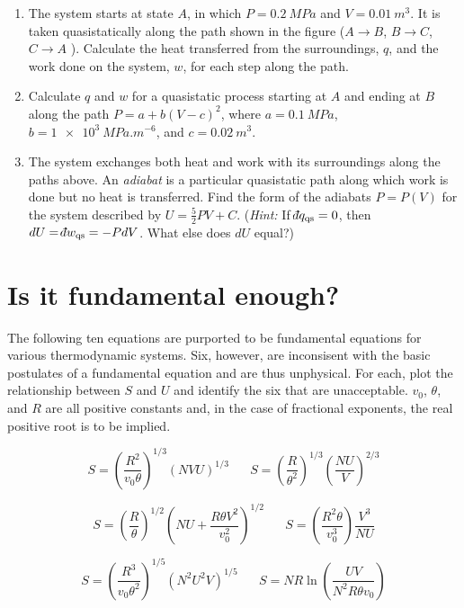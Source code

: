 \documentclass[11pt]{article}
\def\dbar{{\mathchar'26\mkern-12mu d}}
\begin{document}
\begin{enumerate}
\item The system starts at state \(A\), in which \(P= \SI{0.2}{MPa}\) and \(V = \SI{0.01}{m^{3}}\). It is taken quasistatically along the path shown in the figure (\(A \rightarrow B\), \(B \rightarrow C\), \(C \rightarrow A\) ).  Calculate the heat transferred from the surroundings, \(q\), and the work done on the system, \(w\), for each step along the path.

\item Calculate \(q\) and \(w\) for a quasistatic process starting at \(A\) and ending at \(B\) along the path \(P=a + b(V-c)^{2}\), where \(a = \SI{0.1}{MPa}\), \(b= \SI{1e3}{MPa. m^{-6}}\), and \(c = \SI{0.02}{m^{3}}\).

\item The system exchanges both heat and work with its surroundings along the paths above. An \emph{adiabat} is a particular quasistatic path along which work is done but no heat is transferred.  Find the form of the adiabats \(P=P(V)\) for the system described by \(U = \frac{5}{2} PV +C\).  (\emph{Hint:} If \(\dbar q_\text{qs} = 0\), then \(dU = \dbar w_\text{qs} = -PdV\).  What else does \(dU\) equal?)
\end{enumerate}

\section{Is it fundamental enough?}
\label{sec:org5eadcf5}
The following ten equations are purported to be fundamental equations for
various thermodynamic systems.  Six, however, are inconsisent with the basic
  postulates of a fundamental equation and are thus unphysical.  For each, plot
  the relationship between \(S\) and \(U\) and identify the six that are
  unacceptable. \(v_0\), \(\theta\), and \(R\) are all positive constants and, in the
  case of fractional exponents, the real positive root is to be implied.

\[ S = \left ( \frac{R^2}{v_0\theta} \right )^{1/3}\left ( NVU \right
)^{1/3}\hspace{20pt}
S = \left ( \frac{R}{\theta^2} \right )^{1/3}\left ( \frac{NU}{V} \right)^{2/3} \]

\[ S = \left ( \frac{R}{\theta} \right )^{1/2}\left ( NU + \frac{R\theta
    V^2}{v_0^2} \right)^{1/2}
\hspace{20pt}
S = \left ( \frac{R^2\theta}{v_0^3} \right ) \frac{V^3}{NU}  \]

\[ S = \left ( \frac{R^3}{v_0\theta^2} \right )^{1/5}\left ( N^2U^2V
 \right)^{1/5}
\hspace{20pt}
S = NR \ln \left ( \frac{UV}{N^2 R \theta v_0}  \right )  \]
\end{document}
